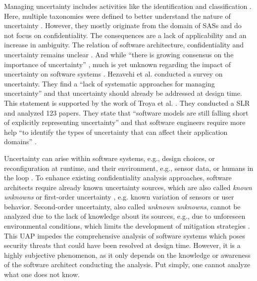 Managing uncertainty includes activities like the identification and classification \cite{acosta_uncertainty_2022,weyns_introduction_2020,hezavehi_uncertainty_2021}.
Here, multiple taxonomies were defined to better understand the nature of uncertainty \cite{perez-palacin_uncertainties_2014,ramirez_taxonomy_2012,walker_defining_2003}.
However, they mostly originate from the domain of \acfp{SAS} and do not focus on confidentiality.
The consequences are a lack of applicability and an increase in ambiguity.
The relation of software architecture, confidentiality and uncertainty remains unclear \cite{hahner_dealing_2021}.
And while \enquote{there is growing consensus on the importance of uncertainty} \cite{hezavehi_uncertainty_2021}, much is yet unknown regarding the impact of uncertainty on software systems \cite{garlan_software_2010}.
Hezavehi et al. \cite{hezavehi_uncertainty_2021} conducted a survey on uncertainty.
They find a \enquote{lack of systematic approaches for managing uncertainty} \cite{hezavehi_uncertainty_2021} and that uncertainty should already be addressed at design time.
This statement is supported by the work of Troya et al. \cite{troya_uncertainty_2021}.
They conducted a \acf{SLR} and analyzed 123 papers.
They state that \enquote{software models are still falling short of explicitly representing uncertainty} \cite{troya_uncertainty_2021} and that
software engineers require more help \enquote{to identify the types of uncertainty that can affect their application domains} \cite{troya_uncertainty_2021}.

Uncertainty can arise within software systems, e.g., design choices, or reconfiguration at runtime, and their environment, e.g., sensor data, or humans in the loop \cite{acosta_uncertainty_2022,perez-palacin_uncertainties_2014}.
To enhance existing confidentiality analysis approaches, software architects require already known uncertainty sources, which are also called \emph{known unknowns} or first-order uncertainty \cite{perez-palacin_uncertainties_2014}, e.g. known variation of sensors or user behavior.
Second-order uncertainty, also called \emph{unknown unknowns}, cannot be analyzed due to the lack of knowledge about its sources, e.g., due to unforeseen environmental conditions, which limits the development of mitigation strategies \cite{weyns_towards_2023}.
This \acf{UAP} impedes the comprehensive analysis of software systems which poses security threats that could have been resolved at design time.
However, it is a highly subjective phenomenon, as it only depends on the knowledge or awareness of the software architect conducting the analysis. 
Put simply, one cannot analyze what one does not know.

